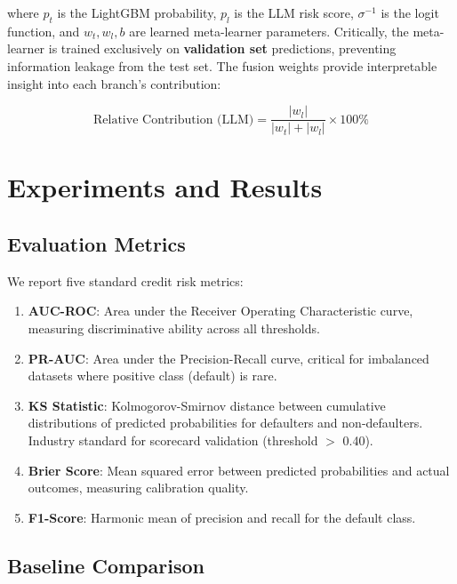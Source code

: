 \documentclass[11pt,a4paper]{article}
\begin{document}
where $p_t$ is the LightGBM probability, $p_l$ is the LLM risk score, $\sigma^{-1}$ is the logit function, and $w_t, w_l, b$ are learned meta-learner parameters. Critically, the meta-learner is trained exclusively on \textbf{validation set} predictions, preventing information leakage from the test set. The fusion weights provide interpretable insight into each branch's contribution:

\begin{equation}
\text{Relative Contribution (LLM)} = \frac{|w_l|}{|w_t| + |w_l|} \times 100\%
\end{equation}

\section{Experiments and Results}\label{sec:experiments}

\subsection{Evaluation Metrics}

We report five standard credit risk metrics:

\begin{enumerate}
    \item \textbf{AUC-ROC}: Area under the Receiver Operating Characteristic curve, measuring discriminative ability across all thresholds.
    \item \textbf{PR-AUC}: Area under the Precision-Recall curve, critical for imbalanced datasets where positive class (default) is rare.
    \item \textbf{KS Statistic}: Kolmogorov-Smirnov distance between cumulative distributions of predicted probabilities for defaulters and non-defaulters. Industry standard for scorecard validation (threshold $>$ 0.40).
    \item \textbf{Brier Score}: Mean squared error between predicted probabilities and actual outcomes, measuring calibration quality.
    \item \textbf{F1-Score}: Harmonic mean of precision and recall for the default class.
\end{enumerate}

\subsection{Baseline Comparison}
\end{document}
